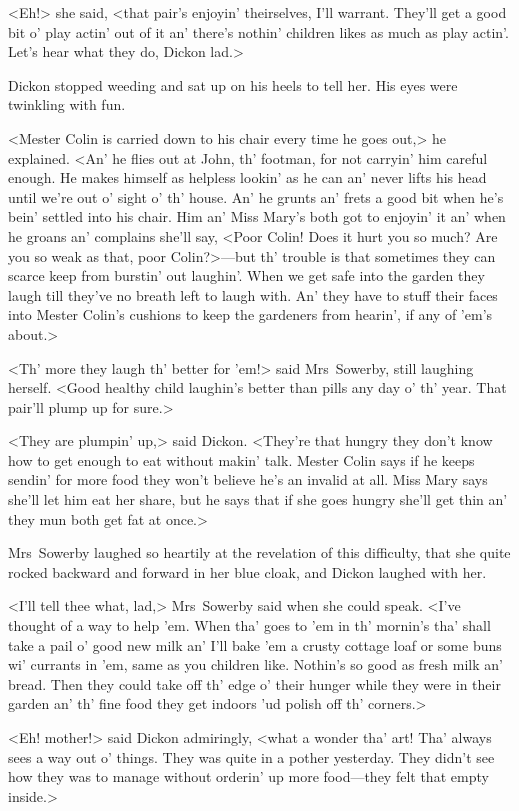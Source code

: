 <Eh!> she said, <that pair's enjoyin' theirselves, I'll warrant. They'll get a good bit o' play actin' out of it an' there's nothin' children likes as much as play actin'. Let's hear what they do, Dickon lad.>

Dickon stopped weeding and sat up on his heels to tell her. His eyes were twinkling with fun.

<Mester Colin is carried down to his chair every time he goes out,> he explained. <An' he flies out at John, th' footman, for not carryin' him careful enough. He makes himself as helpless lookin' as he can an' never lifts his head until we're out o' sight o' th' house. An' he grunts an' frets a good bit when he's bein' settled into his chair. Him an' Miss Mary's both got to enjoyin' it an' when he groans an' complains she'll say, <Poor Colin! Does it hurt you so much? Are you so weak as that, poor Colin?>—but th' trouble is that sometimes they can scarce keep from burstin' out laughin'. When we get safe into the garden they laugh till they've no breath left to laugh with. An' they have to stuff their faces into Mester Colin's cushions to keep the gardeners from hearin', if any of 'em's about.>

<Th' more they laugh th' better for 'em!> said Mrs~Sowerby, still laughing herself. <Good healthy child laughin's better than pills any day o' th' year. That pair'll plump up for sure.>

<They are plumpin' up,> said Dickon. <They're that hungry they don't know how to get enough to eat without makin' talk. Mester Colin says if he keeps sendin' for more food they won't believe he's an invalid at all. Miss Mary says she'll let him eat her share, but he says that if she goes hungry she'll get thin an' they mun both get fat at once.>

Mrs~Sowerby laughed so heartily at the revelation of this difficulty, that she quite rocked backward and forward in her blue cloak, and Dickon laughed with her.

<I'll tell thee what, lad,> Mrs~Sowerby said when she could speak. <I've thought of a way to help 'em. When tha' goes to 'em in th' mornin's tha' shall take a pail o' good new milk an' I'll bake 'em a crusty cottage loaf or some buns wi' currants in 'em, same as you children like. Nothin's so good as fresh milk an' bread. Then they could take off th' edge o' their hunger while they were in their garden an' th' fine food they get indoors 'ud polish off th' corners.>

<Eh! mother!> said Dickon admiringly, <what a wonder tha' art! Tha' always sees a way out o' things. They was quite in a pother yesterday. They didn't see how they was to manage without orderin' up more food—they felt that empty inside.>


